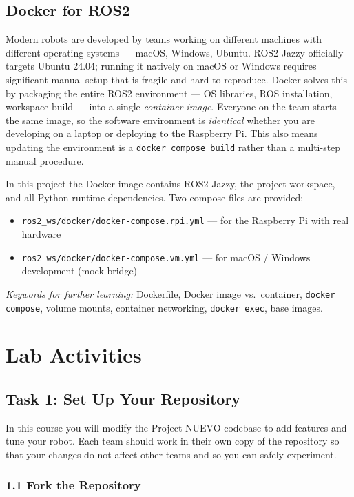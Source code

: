 \documentclass{ol-softwaremanual}
\begin{document}
\subsection{Docker for ROS2}

Modern robots are developed by teams working on different machines with different
operating systems --- macOS, Windows, Ubuntu.
ROS2 Jazzy officially targets Ubuntu 24.04; running it natively on macOS or Windows
requires significant manual setup that is fragile and hard to reproduce.
Docker solves this by packaging the entire ROS2 environment --- OS libraries,
ROS installation, workspace build --- into a single \emph{container image}.
Everyone on the team starts the same image, so the software environment is
\emph{identical} whether you are developing on a laptop or deploying to the Raspberry Pi.
This also means updating the environment is a \texttt{docker compose build} rather than
a multi-step manual procedure.

In this project the Docker image contains ROS2 Jazzy, the project workspace,
and all Python runtime dependencies.
Two compose files are provided:

\begin{itemize}
  \item \texttt{ros2\_ws/docker/docker-compose.rpi.yml} --- for the Raspberry Pi with real hardware
  \item \texttt{ros2\_ws/docker/docker-compose.vm.yml} --- for macOS / Windows development (mock bridge)
\end{itemize}

\noindent\textit{Keywords for further learning:}
Dockerfile, Docker image vs.\ container, \texttt{docker compose}, volume mounts,
container networking, \texttt{docker exec}, base images.


\section{Lab Activities}

\subsection{Task 1: Set Up Your Repository}

In this course you will modify the Project NUEVO codebase to add features and
tune your robot.
Each team should work in their own copy of the repository so that your changes
do not affect other teams and so you can safely experiment.

\subsubsection*{1.1 Fork the Repository}
\end{document}
